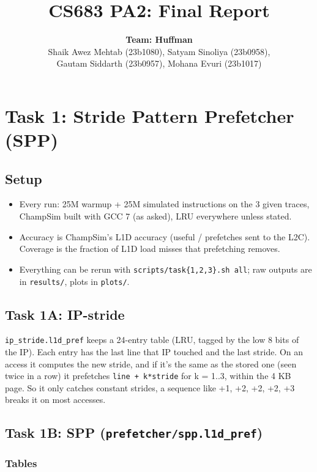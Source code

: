 \documentclass[10pt]{article}
\title{CS683 PA2: Final Report}
\author{\textbf{Team: Huffman} \\[3pt]
  Shaik Awez Mehtab (23b1080), Satyam Sinoliya (23b0958), \\
  Gautam Siddarth (23b0957), Mohana Evuri (23b1017)}
\date{}
\providecommand{\tightlist}{%
  \setlength{\itemsep}{2pt}\setlength{\parskip}{0pt}}
\begin{document}
\maketitle
\section{Task 1: Stride Pattern Prefetcher (SPP)}

\subsection{Setup}

\begin{itemize}
\tightlist
\item Every run: 25M warmup + 25M simulated instructions on the 3 given traces, ChampSim built with GCC 7 (as asked), LRU everywhere unless stated.
\item Accuracy is ChampSim's L1D accuracy (useful / prefetches sent to the L2C). Coverage is the fraction of L1D load misses that prefetching removes.
\item Everything can be rerun with \texttt{scripts/task\{1,2,3\}.sh all}; raw outputs are in \texttt{results/}, plots in \texttt{plots/}.
\end{itemize}

\subsection{Task 1A: IP-stride}

\texttt{ip\_stride.l1d\_pref} keeps a 24-entry table (LRU, tagged by the low 8 bits of the IP). Each entry has the last line that IP touched and the last stride. On an access it computes the new stride, and if it's the same as the stored one (seen twice in a row) it prefetches \texttt{line + k*stride} for k = 1..3, within the 4 KB page. So it only catches constant strides, a sequence like +1, +2, +2, +2, +3 breaks it on most accesses.


\subsection{Task 1B: SPP (\texttt{prefetcher/spp.l1d\_pref})}

\subsubsection{Tables}
\end{document}
